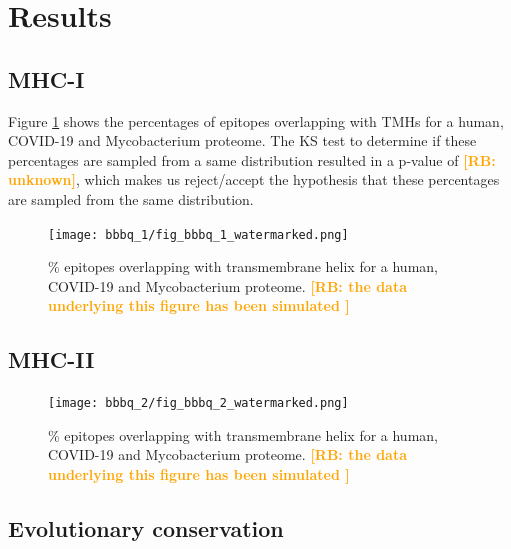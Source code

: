 \documentclass{article}
\newcommand{\richel}[1]{\textcolor{orange}{\textbf{[RB: #1]}}}
\begin{document}
\section{Results}

\subsection{MHC-I}

Figure \ref{fig:1} shows the percentages of epitopes overlapping 
with TMHs for a human, COVID-19 and Mycobacterium proteome.
The KS test to determine if these percentages are sampled from
a same distribution resulted in a p-value of \richel{unknown},
which makes us reject/accept the hypothesis that these percentages
are sampled from the same distribution. 

\begin{figure}[!htbp]
  \texttt{[image: bbbq\_1/fig\_bbbq\_1\_watermarked.png]}
  \caption{
    \% epitopes overlapping with transmembrane helix
    for a human, COVID-19 and Mycobacterium proteome.
    \richel{
      the data underlying this figure has been simulated
    }
  }
  \label{fig:1}
\end{figure}

\subsection{MHC-II}

\begin{figure}[!htbp]
  \texttt{[image: bbbq\_2/fig\_bbbq\_2\_watermarked.png]}
  \caption{
    \% epitopes overlapping with transmembrane helix
    for a human, COVID-19 and Mycobacterium proteome.
    \richel{
      the data underlying this figure has been simulated
    }
  }
  \label{fig:2}
\end{figure}

\subsection{Evolutionary conservation}
\end{document}
